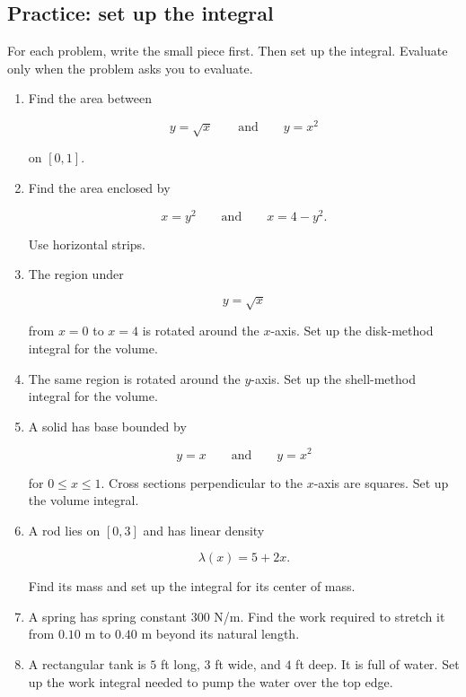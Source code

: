 \subsection{Practice: set up the integral}
\label{subsec:chapter10-practice-setups}

For each problem, write the small piece first.  Then set up the integral.  Evaluate only
when the problem asks you to evaluate.

\begin{enumerate}
\item Find the area between

\[
y=\sqrt{x}
\qquad\text{and}\qquad
y=x^2
\]

on \([0,1]\).

\item Find the area enclosed by

\[
x=y^2
\qquad\text{and}\qquad
x=4-y^2.
\]

Use horizontal strips.

\item The region under

\[
y=\sqrt{x}
\]

from \(x=0\) to \(x=4\) is rotated around the \(x\)-axis.  Set up the disk-method
integral for the volume.

\item The same region is rotated around the \(y\)-axis.  Set up the shell-method integral
for the volume.

\item A solid has base bounded by

\[
y=x
\qquad\text{and}\qquad
y=x^2
\]

for \(0\le x\le1\).  Cross sections perpendicular to the \(x\)-axis are squares.  Set up
the volume integral.

\item A rod lies on \([0,3]\) and has linear density

\[
\lambda(x)=5+2x.
\]

Find its mass and set up the integral for its center of mass.

\item A spring has spring constant \(300\) N/m.  Find the work required to stretch it from
\(0.10\) m to \(0.40\) m beyond its natural length.

\item A rectangular tank is \(5\) ft long, \(3\) ft wide, and \(4\) ft deep.  It is full of water.
Set up the work integral needed to pump the water over the top edge.


\end{enumerate}

